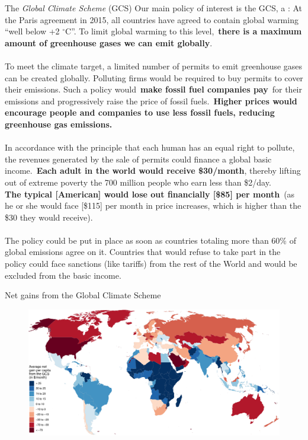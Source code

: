 \documentclass[aspectratio=169,xcolor=dvipsnames, 11pt,mathserif]{beamer}
\begin{document}
\begin{framefont}{\small}
\begin{frame}{The \textit{Global Climate Scheme} (GCS)\label{GCS_def}}
\bbvs \ip Our main policy of interest is the GCS, a :
\bbvs \ip \small{ At the Paris agreement in 2015, all countries have agreed to contain global warming ``well below +2 $\mathrm{{}^\circ}$C''. To limit global warming to this level,~\textbf{there is a maximum amount of greenhouse gases we can emit globally}.\\ \quad \\
To meet the climate target, a limited number of permits to emit greenhouse gases can be created globally. Polluting firms would be required to buy permits to cover their emissions. Such a policy would~\textbf{make fossil fuel companies pay}~for their emissions and progressively raise the price of fossil fuels.~\textbf{Higher prices would encourage people and companies to use less fossil fuels, reducing greenhouse gas emissions.}\\ \quad \\
In accordance with the principle that each human has an equal right to pollute, the revenues generated by the sale of permits could finance a global basic income.~\textbf{Each adult in the world would receive \$30/month}, thereby lifting out of extreme poverty the 700 million people who earn less than \$2/day.\\ 
\textbf{The typical [American] would lose out financially [\$85] per month}~(as he or she would face [\$115] per month in price increases, which is higher than the \$30 they would receive). \\ \quad \\
The policy could be put in place as soon as countries totaling more than 60\% of global emissions agree on it. Countries that would refuse to take part in the policy could face sanctions (like tariffs) from the rest of the World and would be excluded from the basic income.}
\ee
\ee
\end{frame}

\begin{frame}{Net gains from the Global Climate Scheme\label{GCS_gain}}
    \begin{figure}
        \centering %
        \includegraphics[height=.9\textheight]{../figures/maps/mean_gain_2030.pdf} 
    \end{figure}
\end{frame}


\end{framefont}
\end{document}
